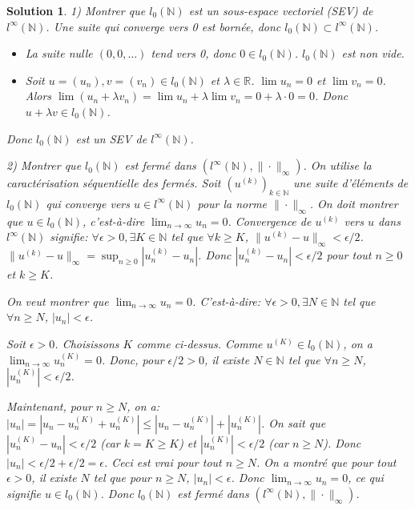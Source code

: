 \documentclass{article}
\newtheorem{solution}{Solution}
\begin{document}
\begin{solution}
1) Montrer que $l_0(\mathbb{N})$ est un sous-espace vectoriel (SEV) de $l^\infty(\mathbb{N})$.
Une suite qui converge vers 0 est bornée, donc $l_0(\mathbb{N}) \subset l^\infty(\mathbb{N})$.
\begin{itemize}
    \item La suite nulle $(0, 0, \dots)$ tend vers 0, donc $0 \in l_0(\mathbb{N})$. $l_0(\mathbb{N})$ est non vide.
    \item Soit $u = (u_n), v = (v_n) \in l_0(\mathbb{N})$ et $\lambda \in \mathbb{R}$.
    $\lim u_n = 0$ et $\lim v_n = 0$.
    Alors $\lim (u_n + \lambda v_n) = \lim u_n + \lambda \lim v_n = 0 + \lambda \cdot 0 = 0$.
    Donc $u + \lambda v \in l_0(\mathbb{N})$.
\end{itemize}
Donc $l_0(\mathbb{N})$ est un SEV de $l^\infty(\mathbb{N})$.

2) Montrer que $l_0(\mathbb{N})$ est fermé dans $(l^\infty(\mathbb{N}), \| \cdot \|_\infty)$.
On utilise la caractérisation séquentielle des fermés.
Soit $(u^{(k)})_{k \in \mathbb{N}}$ une suite d'éléments de $l_0(\mathbb{N})$ qui converge vers $u \in l^\infty(\mathbb{N})$ pour la norme $\| \cdot \|_\infty$.
On doit montrer que $u \in l_0(\mathbb{N})$, c'est-à-dire $\lim_{n \to \infty} u_n = 0$.
Convergence de $u^{(k)}$ vers $u$ dans $l^\infty(\mathbb{N})$ signifie:
$\forall \epsilon > 0, \exists K \in \mathbb{N}$ tel que $\forall k \ge K$, $\|u^{(k)} - u\|_\infty < \epsilon/2$.
$\|u^{(k)} - u\|_\infty = \sup_{n \ge 0} |u_n^{(k)} - u_n|$. Donc $|u_n^{(k)} - u_n| < \epsilon/2$ pour tout $n \ge 0$ et $k \ge K$.

On veut montrer que $\lim_{n \to \infty} u_n = 0$. C'est-à-dire:
$\forall \epsilon > 0, \exists N \in \mathbb{N}$ tel que $\forall n \ge N$, $|u_n| < \epsilon$.

Soit $\epsilon > 0$. Choisissons $K$ comme ci-dessus.
Comme $u^{(K)} \in l_0(\mathbb{N})$, on a $\lim_{n \to \infty} u_n^{(K)} = 0$.
Donc, pour $\epsilon/2 > 0$, il existe $N \in \mathbb{N}$ tel que $\forall n \ge N$, $|u_n^{(K)}| < \epsilon/2$.

Maintenant, pour $n \ge N$, on a:
$|u_n| = |u_n - u_n^{(K)} + u_n^{(K)}| \le |u_n - u_n^{(K)}| + |u_n^{(K)}|$.
On sait que $|u_n^{(K)} - u_n| < \epsilon/2$ (car $k=K \ge K$) et $|u_n^{(K)}| < \epsilon/2$ (car $n \ge N$).
Donc $|u_n| < \epsilon/2 + \epsilon/2 = \epsilon$.
Ceci est vrai pour tout $n \ge N$.
On a montré que pour tout $\epsilon > 0$, il existe $N$ tel que pour $n \ge N$, $|u_n| < \epsilon$.
Donc $\lim_{n \to \infty} u_n = 0$, ce qui signifie $u \in l_0(\mathbb{N})$.
Donc $l_0(\mathbb{N})$ est fermé dans $(l^\infty(\mathbb{N}), \| \cdot \|_\infty)$.


\end{solution}
\end{document}
